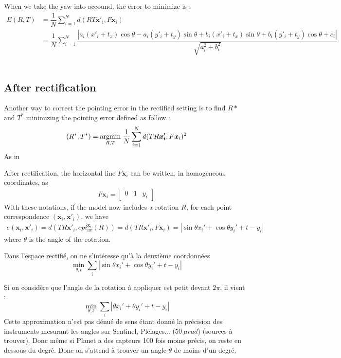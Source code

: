 \documentclass[paper=a4, fontsize=11pt, onecolumn, tikz, dvipsnames, svgnames, x11names]{article}
\begin{document}
When we take the yaw into accound, the error to minimize is :
\begin{align*}
E(R, T) &= \dfrac{1}{N} \sum\limits_{i=1}^{N} d(RT\textbf{x}'_i, F\textbf{x}_i) \\
&= \dfrac{1}{N} \sum\limits_{i=1}^{N} \dfrac{|a_i(x'_i + t_x)\cos \theta  - a_i (y'_i + t_y)\sin \theta  + b_i(x'_i + t_x)\sin \theta  + b_i  (y'_i + t_y)\cos \theta+ c_i|}{\sqrt{a_i^2 + b_i^2}}
\end{align*}\\

\subsection{After rectification}

Another way to correct the pointing error in the rectified setting is to find $R*$ and $T^*$ minimizing the pointing error defined as follow :
\begin{align}
    (R^*, T^*) = \underset{R,T}{\operatorname{argmin}}\; \frac{1}{N} \sum_{i=1}^N d(TR\bm{x_i'}, F\bm{x}_i)^2
\end{align}
As in~\cite{de2014b}

After rectification, the horizontal line $F\bm{x}_i$ can be written, in homogeneous coordinates, as
\begin{align*}
F\bm{x}_i =  \begin{bmatrix} 0 & 1 & y_i \end{bmatrix}
\end{align*}
With these notations, if the model now includes a rotation $R$, for each point correspondence $(\bm{x}_i , \bm{x}'_i)$, we have
\begin{align*}
e(\textbf{x}_i, \textbf{x}'_i) = d(TR\bm{x}'_i, epi^{\textbf{x}_i}_{u v}(R)) = d(TR\bm{x}'_i, F\bm{x}_i) = |\sin \theta x_i'  + \cos \theta y_i' + t - y_i |
\end{align*}
where $\theta$ is the angle of the rotation.


Dans l'espace rectifié, on ne s'intéresse qu'à la deuxième coordonnées
$$
\min_{\theta, t}\sum_i |\sin \theta x_i'  + \cos \theta y_i' + t - y_i |
$$

Si on considère que l'angle de la rotation à appliquer est petit devant $2\pi$, il vient :
$$
\min_{\theta, t}\sum_i |\theta x_i'  + \theta y_i' + t - y_i |
$$
Cette approximation n'est pas dénué de sens étant donné la précision des instruments mesurant les angles sur Sentinel, Pleiages... ($50~\mu rad$) (sources à trouver). Donc même si Planet a des capteurs 100 fois moins précis, on reste en dessous du degré. Donc on s'attend à trouver un angle $\theta$ de moins d'un degré.
\end{document}
